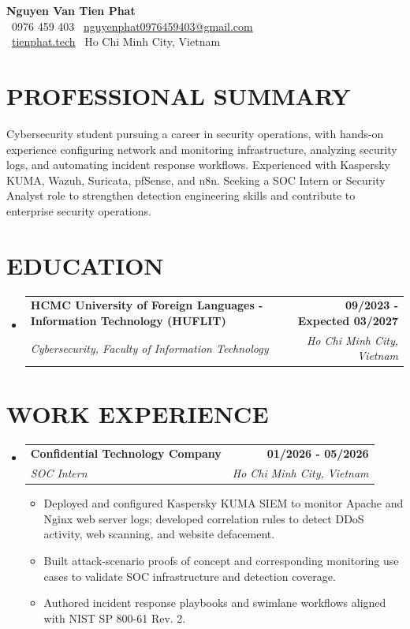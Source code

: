 \documentclass[10pt,a4paper]{article}
\makeatletter
\newcommand{\resumeSubheading}[4]{
  \vspace{-1pt}\item
    \begin{tabularx}{\linewidth}[t]{@{}Xr@{}}
      \textbf{#1} & \textbf{#2} \\
      \textit{#3} & \textit{#4} \\
    \end{tabularx}\vspace{-1pt}
}
\makeatother
\begin{document}
\begin{center}
    {\Huge \textbf{\color{primaryColor} Nguyen Van Tien Phat}} \\ \vspace{8pt}
    \small \faPhone\ 0976 459 403 \quad
    \faEnvelope\ \href{mailto:nguyenphat0976459403@gmail.com}{nguyenphat0976459403@gmail.com} \\ \vspace{3pt}
    \faGlobe\ \href{https://tienphat.tech}{tienphat.tech} \quad
    \faMapMarker\ Ho Chi Minh City, Vietnam
\end{center}

\section*{PROFESSIONAL SUMMARY}
Cybersecurity student pursuing a career in security operations, with hands-on experience configuring network and monitoring infrastructure, analyzing security logs, and automating incident response workflows. Experienced with Kaspersky KUMA, Wazuh, Suricata, pfSense, and n8n. Seeking a SOC Intern or Security Analyst role to strengthen detection engineering skills and contribute to enterprise security operations.

\section*{EDUCATION}
\begin{itemize}[leftmargin=0.15in, label={}]
  \resumeSubheading
    {HCMC University of Foreign Languages -\newline Information Technology (HUFLIT)}{09/2023 - Expected 03/2027}
    {Cybersecurity, Faculty of Information Technology}{Ho Chi Minh City, Vietnam}
\end{itemize}

\section*{WORK EXPERIENCE}
\begin{itemize}[leftmargin=0.15in, label={}]
  \resumeSubheading
    {Confidential Technology Company}{01/2026 - 05/2026}
    {SOC Intern}{Ho Chi Minh City, Vietnam}
    \begin{itemize}[leftmargin=0.15in, label=\textbullet]
        \item Deployed and configured Kaspersky KUMA SIEM to monitor Apache and Nginx web server logs; developed correlation rules to detect DDoS activity, web scanning, and website defacement.
        \item Built attack-scenario proofs of concept and corresponding monitoring use cases to validate SOC infrastructure and detection coverage.
        \item Authored incident response playbooks and swimlane workflows aligned with NIST SP 800-61 Rev. 2.
    \end{itemize}
\end{itemize}
\end{document}
